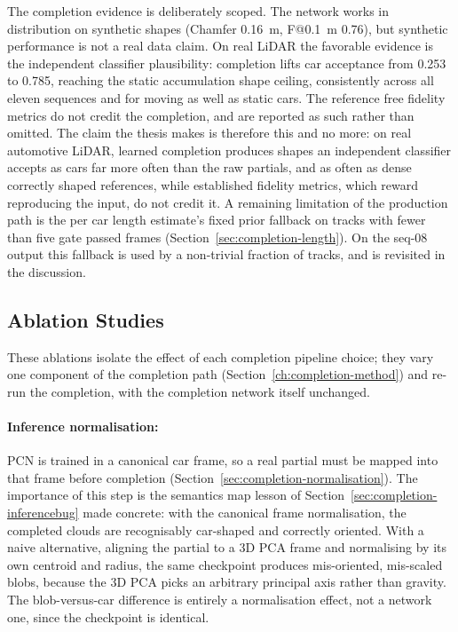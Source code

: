 \documentclass[a4paper,12pt]{report}
\begin{document}
The completion evidence is deliberately scoped. The network works in distribution on
synthetic shapes (Chamfer \SI{0.16}{\meter}, F@\SI{0.1}{\meter} \num{0.76}), but synthetic
performance is not a real data claim. On real LiDAR the favorable evidence is the
independent classifier plausibility: completion lifts car acceptance from \num{0.253} to
\num{0.785}, reaching the static accumulation shape ceiling, consistently across all eleven
sequences and for moving as well as static cars. The reference free fidelity metrics do not
credit the completion, and are reported as such rather than omitted. The claim the thesis
makes is therefore this and no more: on real automotive LiDAR, learned completion produces
shapes an independent classifier accepts as cars far more often than the raw partials, and as
often as dense correctly shaped references, while established fidelity metrics, which reward
reproducing the input, do not credit it. A remaining limitation of the production path is the
per car length estimate's fixed prior fallback on tracks with fewer than five gate passed
frames (Section~\ref{sec:completion-length}). On the seq-08 output this fallback is used by a
non-trivial fraction of tracks, and is revisited in the discussion.

\subsection{Ablation Studies}
\label{sec:abl-completion}

These ablations isolate the effect of each completion pipeline choice; they vary one
component of the completion path (Section~\ref{ch:completion-method}) and re-run the
completion, with the completion network itself unchanged.

\paragraph{Inference normalisation:} PCN is trained in a canonical car frame, so a real
partial must be mapped into that frame before completion
(Section~\ref{sec:completion-normalisation}). The importance of this step is the
semantics map lesson of Section~\ref{sec:completion-inferencebug} made concrete: with the
canonical frame normalisation, the completed clouds are recognisably car-shaped and
correctly oriented. With a naive alternative, aligning the partial to a 3D PCA frame and
normalising by its own centroid and radius, the same checkpoint produces mis-oriented,
mis-scaled blobs, because the 3D PCA picks an arbitrary principal axis rather than gravity.
The blob-versus-car difference is entirely a normalisation effect, not a network one, since
the checkpoint is identical.
\end{document}
